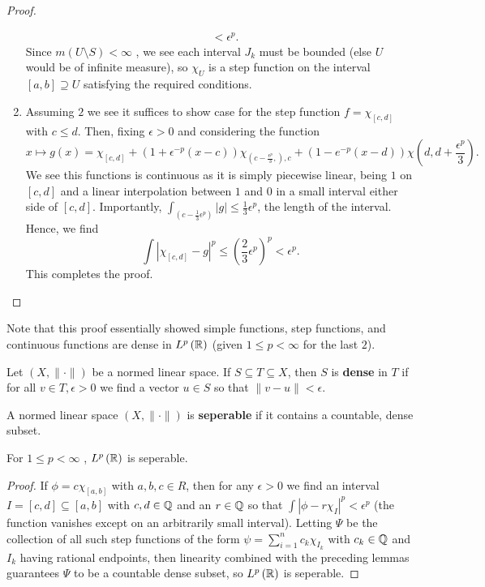 \begin{proof}
\begin{enumerate}
\begin{align*}
				&< \epsilon^{p}
			.\end{align*}
	Since \(m\left( U \setminus S \right)< \infty \) , we see each interval \(J_{k}\) must be bounded (else \(U\) would be of infinite measure), so \( \chi_{U}\) is a step function on the interval \(\left[ a, b \right] \supseteq U\) satisfying the required conditions.
	\item Assuming \(2\) we see it suffices to show case for the step function \(f = \chi_{\left[ c, d \right] }\) with \(c \le d\). Then, fixing \(\epsilon > 0\) and considering the function \[
	x \mapsto g\left(x\right) = \chi_{\left[ c, d \right] }+ \left( 1 + \epsilon^{-p}\left( x-c \right)  \right) \chi_{\left( c-\frac{\epsilon^{p}}{3},  \right), c }+ \left( 1-e^{-p}\left( x-d \right)  \right) \chi\left( d, d+\frac{\epsilon^{p}}{3} \right)
	.\]
	We see this functions is continuous as it is simply piecewise linear, being \(1\) on \(\left[ c, d \right] \) and a linear interpolation between \(1\) and \(0\) in a small interval either side of \(\left[ c, d \right] \). Importantly, \(\int_{\left( c-\frac{1}{3}\epsilon^{p} \right)  } \left| g \right| \le \frac{1}{3}\epsilon^{p}\), the length of the interval. \\
	Hence, we find \[
	\int\left| \chi_{\left[ c, d \right] } - g \right| ^{p} \le (\frac{2}{3}\epsilon^{p})^{p}< \epsilon^{p}
	.\]
	This completes the proof.
	\end{enumerate}
	\end{proof}
	Note that this proof essentially showed simple functions, step functions, and continuous functions are dense in \(L^{p}\left( \mathbb{R} \right) \) (given \(1 \le p < \infty\) for the last \(2\)).
\begin{definition}[Density]
Let \(\left( X, \|\cdot\| \right) \) 	be a normed linear space. If \(S \subseteq T \subseteq X\), then \(S\) is \textbf{dense} in \(T\) if for all \(v \in T, \epsilon > 0 \) we find a vector \(u \in S\) so that \(\|v-u\|< \epsilon\).
\end{definition}
\begin{definition}[Seperability]
	A normed linear space \(\left( X, \|\cdot\| \right) \) is \textbf{seperable} if it contains a countable, dense subset.
\end{definition}
\begin{theorem}
	For \(1\le p < \infty\) , \(L^{p}\left( \mathbb{R} \right) \) is seperable.
\end{theorem}
\begin{proof}
	If \(\phi = c \chi_{\left[ a, b \right] }\) with \(a, b, c \in R\), then for any \(\epsilon > 0\) we find an interval \(I = \left[ c, d \right] \subseteq \left[ a, b \right] \) with \(c, d \in \mathbb{Q}\) and an \(r \in \mathbb{Q}\) so that \(\int \left| \phi - r \chi_{I} \right|^{p} < \epsilon^{p} \) (the function vanishes except on an arbitrarily small interval). Letting \(\Psi\) be the collection of all such step functions of the form \(\psi = \sum_{i= 1}^{n} c_{k} \chi_{I_{k}}\) with \(c_{k} \in \mathbb{Q}\) and \(I_{k}\)  having rational endpoints, then linearity combined with the preceding lemmas guarantees \(\Psi\)  to be a countable dense subset, so \(L^{p}\left( \mathbb{R} \right) \) is seperable.
\end{proof}
